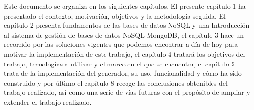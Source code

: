 Este documento se organiza en los siguientes capítulos. El presente
capítulo 1 ha presentado el contexto, motivación, objetivos y la
metodología seguida. El capítulo 2 presenta fundamentos de las bases de
datos NoSQL y una Introducción al sistema de gestión de bases de datos
NoSQL MongoDB, el capítulo 3 hace un recorrido por las soluciones vigentes
que podemos encontrar a día de hoy para motivar la implementación de este
trabajo, el capítulo 4 tratará los objetivos del trabajo, tecnologías a
utilizar y el marco en el que se encuentra, el capítulo 5 trata de la
implementación del generador, su uso, funcionalidad y cómo ha sido
construido y por último el capítulo 8 recoge las conclusiones obtenibles
del trabajo realizado, así como una serie de vías futuras con el propósito
de ampliar y extender el trabajo realizado.

